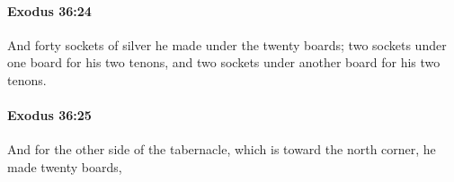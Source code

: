 		\paragraph{Exodus 36:24} %
			\label{EXODUS-36-24}

			And forty sockets of silver he made under the twenty boards; two sockets under one board for his two tenons, and two sockets under another board for his two tenons.


		\paragraph{Exodus 36:25} %
			\label{EXODUS-36-25}

			And for the other side of the tabernacle, which is toward the north corner, he made twenty boards,


